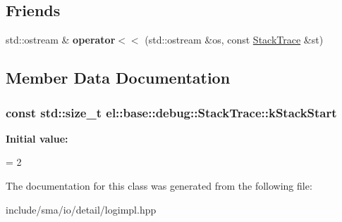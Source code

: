 \subsection*{Friends}
\begin{DoxyCompactItemize}
\item 
\hypertarget{classel_1_1base_1_1debug_1_1StackTrace_a3b8e978df331fbe725e2a39d031355cc}{std\-::ostream \& {\bfseries operator$<$$<$} (std\-::ostream \&os, const \hyperlink{classel_1_1base_1_1debug_1_1StackTrace}{Stack\-Trace} \&st)}\label{classel_1_1base_1_1debug_1_1StackTrace_a3b8e978df331fbe725e2a39d031355cc}

\end{DoxyCompactItemize}


\subsection{Member Data Documentation}
\hypertarget{classel_1_1base_1_1debug_1_1StackTrace_ab8a89fe5c4f779d3e685a5e61f1136e2}{
\subsubsection[{k\-Stack\-Start}]{\setlength{\rightskip}{0pt plus 5cm}const std\-::size\-\_\-t el\-::base\-::debug\-::\-Stack\-Trace\-::k\-Stack\-Start\hspace{0.3cm}{\ttfamily [static]}}}\label{classel_1_1base_1_1debug_1_1StackTrace_ab8a89fe5c4f779d3e685a5e61f1136e2}
{\bfseries Initial value\-:}
\begin{DoxyCode}
=
          2
\end{DoxyCode}


The documentation for this class was generated from the following file\-:\begin{DoxyCompactItemize}
\item 
include/sma/io/detail/logimpl.\-hpp\end{DoxyCompactItemize}
